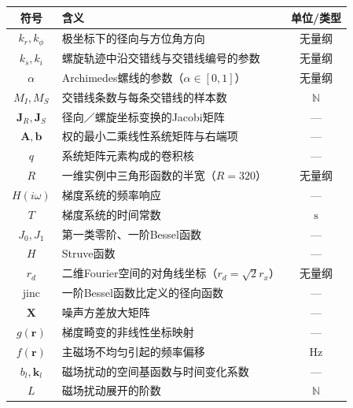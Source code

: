\documentclass[12pt]{article}
\begin{document}
\begin{table}[h]
    \small
    \centering
    \begin{tabularx}{\textwidth}{c X c}
        \toprule
        \textbf{符号} & \textbf{含义} & \textbf{单位/类型} \\
        \midrule
        $k_r,k_\phi$ & 极坐标下的径向与方位角方向 & 无量纲 \\
        $k_s,k_i$ & 螺旋轨迹中沿交错线与交错线编号的参数 & 无量纲 \\
        $\alpha$ & Archimedes螺线的参数（$\alpha\in[0,1]$） & 无量纲 \\
        $M_I,M_S$ & 交错线条数与每条交错线的样本数 & $\mathbb{N}$ \\
        $\mathbf{J}_R,\mathbf{J}_S$ & 径向／螺旋坐标变换的Jacobi矩阵 & --- \\
        $\mathbf{A},\bm{b}$ & 权的最小二乘线性系统矩阵与右端项 & --- \\
        $q$ & 系统矩阵元素构成的卷积核 & --- \\
        $R$ & 一维实例中三角形函数的半宽（$R=320$） & 无量纲 \\
        $H(i\omega)$ & 梯度系统的频率响应 & --- \\
        $T$ & 梯度系统的时间常数 & $\mathrm{s}$ \\
        $J_0,J_1$ & 第一类零阶、一阶Bessel函数 & --- \\
        $H$ & Struve函数 & --- \\
        $r_d$ & 二维Fourier空间的对角线坐标（$r_d=\sqrt{2}r_x$） & 无量纲 \\
        $\operatorname{jinc}$ & 一阶Bessel函数比定义的径向函数 & --- \\
        $\mathbf{X}$ & 噪声方差放大矩阵 & --- \\
        $g(\bm{r})$ & 梯度畸变的非线性坐标映射 & --- \\
        $f(\bm{r})$ & 主磁场不均匀引起的频率偏移 & $\mathrm{Hz}$ \\
        $b_l,\bm{k}_l$ & 磁场扰动的空间基函数与时间变化系数 & --- \\
        $L$ & 磁场扰动展开的阶数 & $\mathbb{N}$ \\
        \bottomrule
    \end{tabularx}
\end{table}

\newpage
\end{document}
